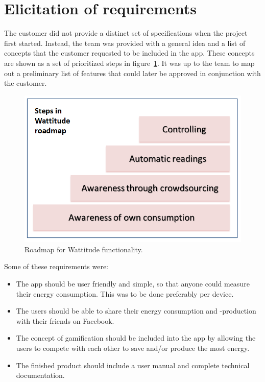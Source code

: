 \section{Elicitation of requirements}
\label{sec:obtainingreq}

The customer did not provide a distinct set of specifications when the project first started. Instead, the team was provided with a general idea and a list of concepts that the customer requested to be included in the app. These concepts are shown as a set of prioritized steps in figure~\ref{fig:roadmap}. It was up to the team to map out a preliminary list of features that could later be approved in conjunction with the customer.

\begin{figure}[H]
\centering
\includegraphics[height=0.4\textheight]{ch/specification/fig/roadmap.png}
\caption{Roadmap for Wattitude functionality.}
\label{fig:roadmap}
\end{figure}

Some of these requirements were:
\begin{itemize}
\item The app should be user friendly and simple, so that anyone could measure their energy consumption. This was to be done preferably per device. 
\item The users should be able to share their energy consumption and -production with their friends on Facebook. 
\item The concept of \gls{gamification} should be included into the app by allowing the users to compete with each other to save and/or produce the most energy. 
\item The finished product should include a user manual and complete technical documentation.
\end{itemize}

